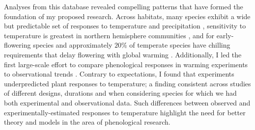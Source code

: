 \documentclass[12pt,a4paper,oneside]{article}
\begin{document}
Analyses from this database revealed compelling patterns that have formed the foundation of my proposed research. Across habitats, many species exhibit a wide but predictable set of responses to temperature and precipitation \citep{Cook:2012,pauncc}, sensitivity to temperature is greatest in northern hemisphere communities \citep{Cook:2012}, and for early-flowering species \citep{Wolkovich:2012n} and approximately \(20\%\) of temperate species have chilling requirements that delay flowering with global warming \citep{Cook:2012pnas}. Additionally, I led the first large-scale effort to compare phenological responses in warming experiments to observational trends \citep{Wolkovich:2012n}. Contrary to expectations, I found that experiments underpredicted plant responses to temperature; a finding consistent across studies of different designs, durations and when considering species for which we had both experimental and observational data. Such differences between observed and experimentally-estimated responses to temperature highlight the need for better theory and models in the area of phenological research.  \\
\end{document}
